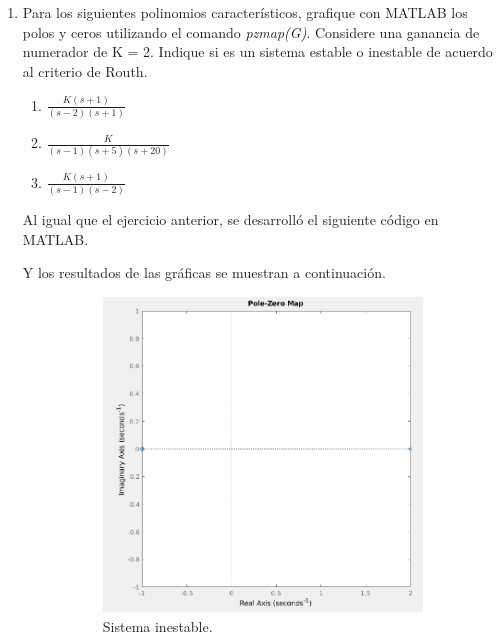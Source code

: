 \documentclass[12pt, letterpaper]{article}
\begin{document}
\begin{enumerate}
			\item Para los siguientes polinomios característicos, grafique con MATLAB los polos  y ceros utilizando el comando \textit{pzmap(G)}. Considere una ganancia de numerador de K = 2. Indique si es un sistema estable o inestable de acuerdo al criterio de Routh.
				\begin{enumerate}
					\item $\frac{K(s+1)}{(s-2)(s+1)}$
					\item $\frac{K}{(s-1)(s+5)(s+20)}$
					\item $\frac{K(s+1)}{(s-1)(s-2)}$
				\end{enumerate}
				Al igual que el ejercicio anterior, se desarrolló el siguiente código en MATLAB.
				
				Y los resultados de las gráficas se muestran a continuación.
				\begin{figure}[H]
					\centering
					\begin{subfigure}[b]{0.49\linewidth}
						\includegraphics[width=\linewidth]{4a.png}
						\caption{Sistema inestable.}
					\end{subfigure}
					\begin{subfigure}[b]{0.49\linewidth}

\end{subfigure}
\end{figure}
\end{enumerate}
\end{document}
